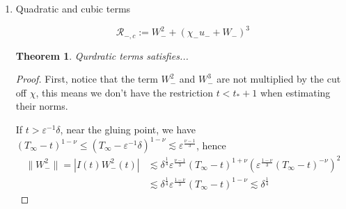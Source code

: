 \documentclass[letterpaper,11pt]{article}
\newcommand{\rmO}{\mathcal{O}}
\newcommand{\eps}{\varepsilon}
\newcommand{\lar}{ \lesssim }
\numberwithin{equation}{section}
\theoremstyle{plain}
\newtheorem{theorem}{Theorem}[section]
\begin{document}
\begin{enumerate}
\begin{itemize}
\begin{enumerate}
\begin{proof}
It then follows that
\begin{align*}
|I(t)\chi_- u_+ W_+|_\infty &\lar I(t)(T_\infty - t)^{-(1+\eta)} \lar I(\eps^{-1}\delta)(T_\infty - \eps^{-1}\delta)^{-(1+\eta)} \\
&\lar \eps^{-\frac{2}{3}} \eps^{\frac{1+\eta}{3}} = \rmO(\eps^{\frac{\eta-1}{3}} ).
\end{align*}
Then we apply the claim to $I(t)\chi_-u_-W_+$
\begin{align*}
|I(t)\chi_- u_- W_+|_\infty  &\lar \frac{\sqrt{\delta-\eps t}+\eps^{1/3}}{ \delta^{-\frac{1}{4}}(\delta-\eps t)^{\frac{3}{2}} + \delta^{\frac{1}{4}}\eps^{2/3}} (T_\infty - \eps^{-1}\delta)^{-\eta} \\
& = \frac{\sqrt{\delta-\eps t}+\eps^{1/3}}{ \delta^{-\frac{1}{4}}(\delta-\eps t)^{\frac{3}{2}} + \delta^{\frac{1}{4}}\eps^{2/3}} \frac{\eps^{\eta}}{(\delta -\eps t +\eps^{\frac{2}{3}}\Omega_0)^\eta}\\
&= \dfrac{(\delta \beta)^{1/2} + \eps^{1/3}} {(\delta \beta)^{3/2} + \eps^{2/3}} \dfrac{\eps^\eta}{(\delta \beta + \eps^{2/3} \Omega_0 )^{\eta} }\\
& \lar \dfrac{1} {(\delta \beta)^{3/2} + \eps^{2/3}} \dfrac{\eps^\eta}{( (\delta \beta)^{1/2} + \eps^{1/3} )^{2\eta -1} } \\
& \lar \eps^{\eta}\eps^{-\frac{2}{3}}\eps^{\frac{1-2\eta}{3}} = \eps^{\frac{\eta-1}{3}}
\end{align*}
where $\beta = 1-\eps \delta^{-1}t$.
\end{proof}




\item  Quadratic and cubic terms

\[
\mathcal{R}_{-,c}:= W_-^2 +(\chi_- u_- +W_-)^3 
\]

\begin{theorem}
Qurdratic terms satisfies...
\end{theorem}

\begin{proof}
First, notice that the term $W_-^2$ and $W_-^3$ are not multiplied by the cut off $\chi$, this means we don't have the restriction $t<t_*+1$ when estimating their norms.

If $t > \eps^{-1}\delta$, near the gluing point, we have $(T_\infty -t )^{1-\nu} \le (T_\infty - \eps^{-1}\delta)^{1-\nu} \lar \eps^{\frac{\nu-1}{3}}$, hence 
\begin{align*}
\|W_-^2\| = |I(t) W_-^2(t) | &\lar \delta^{\frac{1}{4}} \eps^{\frac{\nu-1}{3}}(T_\infty - t)^{1+\nu}\left( \eps^{\frac{1-\nu}{3}}(T_\infty - t)^{-\nu}\right)^2\\ & \lar \delta^{\frac{1}{4}} \eps^{\frac{1-\nu}{3}}(T_\infty-t)^{1-\nu} \lar \delta^{\frac{1}{4}}
\end{align*} 


\end{proof}
\end{enumerate}
\end{itemize}
\end{enumerate}
\end{document}
